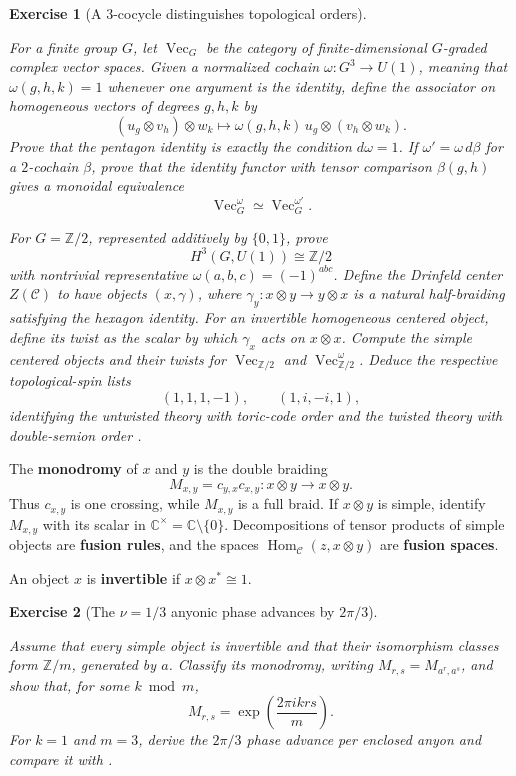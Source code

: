 \documentclass{article}
\newtheorem{exercise}{Exercise}
\begin{document}
\begin{exercise}[A $3$-cocycle distinguishes topological orders]
\label{ex:three-cocycle-associator}\leavevmode\par
\textit{For a finite group $G$, let $\operatorname{Vec}_G$ be the category
of finite-dimensional $G$-graded complex vector spaces. Given a normalized
cochain $\omega:G^3\to U(1)$, meaning that $\omega(g,h,k)=1$ whenever one
argument is the identity, define the associator on homogeneous vectors
of degrees $g,h,k$ by}
\[
(u_g\otimes v_h)\otimes w_k
\longmapsto
\omega(g,h,k)\,
u_g\otimes(v_h\otimes w_k).
\]
\textit{Prove that the pentagon identity is exactly the condition
$d\omega=1$. If $\omega'=\omega\,d\beta$ for a $2$-cochain $\beta$, prove
that the identity functor with tensor comparison $\beta(g,h)$ gives a
monoidal equivalence}
\[
\operatorname{Vec}_G^\omega\simeq\operatorname{Vec}_G^{\omega'}.
\]

\textit{For $G=\mathbb Z/2$, represented additively by $\{0,1\}$, prove}
\[
H^3(G,U(1))\cong\mathbb Z/2
\]
\textit{with nontrivial representative
$\omega(a,b,c)=(-1)^{abc}$. Define the Drinfeld center
$Z(\mathcal C)$ to have objects $(x,\gamma)$, where
$\gamma_y:x\otimes y\to y\otimes x$ is a natural half-braiding satisfying
the hexagon identity. For an invertible homogeneous centered object, define
its twist as the scalar by which $\gamma_x$ acts on $x\otimes x$. Compute the
simple centered objects and their twists for
$\operatorname{Vec}_{\mathbb Z/2}$ and
$\operatorname{Vec}_{\mathbb Z/2}^{\omega}$. Deduce the respective
topological-spin lists}
\[
(1,1,1,-1),
\qquad
(1,i,-i,1),
\]
\textit{identifying the untwisted theory with toric-code order and the
twisted theory with double-semion order}
\cite{dijkgraaf-witten,levin-wen}.\par
\end{exercise}

The \textbf{monodromy} of $x$ and $y$ is the double braiding
\[
M_{x,y}=c_{y,x}c_{x,y}:x\otimes y\longrightarrow x\otimes y.
\]
Thus $c_{x,y}$ is one crossing, while $M_{x,y}$ is a full braid. If $x\otimes y$ is simple, identify $M_{x,y}$ with its scalar in $\mathbb C^\times=\mathbb C\setminus\{0\}$. Decompositions of tensor products of simple objects are \textbf{fusion rules}, and the spaces $\operatorname{Hom}_{\mathcal C}(z,x\otimes y)$ are \textbf{fusion spaces}.

An object $x$ is \textbf{invertible} if $x\otimes x^*\cong1$.

\begin{exercise}[The $\nu=1/3$ anyonic phase advances by $2\pi/3$]
\label{ex:anyonic-monodromy}\leavevmode\par
\textit{Assume that every simple object is invertible and that their
isomorphism classes form $\mathbb Z/m$, generated by $a$. Classify its
monodromy, writing $M_{r,s}=M_{a^r,a^s}$, and show that, for some
$k\bmod m$,}
\[
M_{r,s}=\exp\left(\frac{2\pi i krs}{m}\right).
\]
\textit{For $k=1$ and $m=3$, derive the $2\pi/3$ phase advance per enclosed
anyon and compare it with \cite{nakamura-anyons}.}
\end{exercise}
\end{document}
